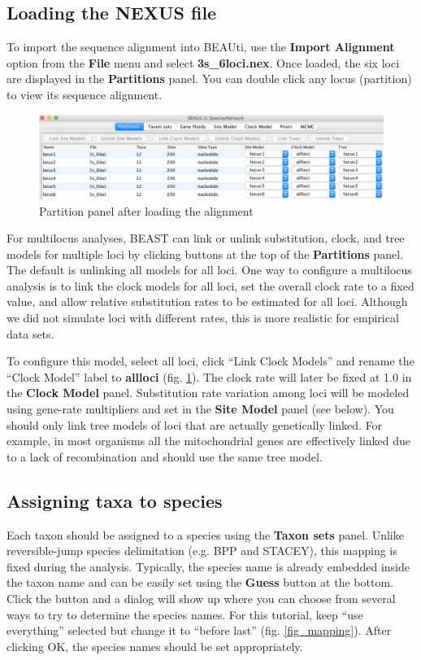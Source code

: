 \documentclass[11pt]{article}
\begin{document}
\subsection*{Loading the NEXUS file}

To import the sequence alignment into BEAUti, use the \textbf{Import Alignment} option from the \textbf{File} menu and select \textbf{3s\_6loci.nex}. Once loaded, the six loci are displayed in the \textbf{Partitions} panel. You can double click any locus (partition) to view its sequence alignment.

\begin{figure}[h]
\center
\includegraphics[width=1.0\textwidth]{figs/fig3_partition.png}
\caption{Partition panel after loading the alignment}
\label{fig_partition}
\end{figure}

For multilocus analyses, BEAST can link or unlink substitution, clock, and tree models for multiple loci by clicking buttons at the top of the \textbf{Partitions} panel. The default is unlinking all models for all loci.
One way to configure a multilocus analysis is to link the clock models for all loci, set the overall clock rate to a fixed value, and allow relative substitution rates to be estimated for all loci. Although we did not simulate loci with different rates, this is more realistic for empirical data sets.

To configure this model, select all loci, click ``Link Clock Models'' and rename the ``Clock Model'' label to \textbf{allloci} (fig. \ref{fig_partition}). The clock rate will later be fixed at 1.0 in the \textbf{Clock Model} panel. Substitution rate variation among loci will be modeled using gene-rate multipliers and set in the \textbf{Site Model} panel (see below).
You should only link tree models of loci that are actually genetically linked. For example, in most organisms all the mitochondrial genes are effectively linked due to a lack of recombination and should use the same tree model.

\subsection*{Assigning taxa to species}
Each taxon should be assigned to a species using the \textbf{Taxon sets} panel. Unlike reversible-jump species delimitation (e.g. BPP and STACEY), this mapping is fixed during the analysis. Typically, the species name is already embedded inside the taxon name and can be easily set using the \textbf{Guess} button at the bottom. Click the button and a dialog will show up where you can choose from several ways to try to determine the species names. For this tutorial, keep ``use everything'' selected but change it to ``before last'' (fig. \ref{fig_mapping}). After clicking OK, the species names should be set appropriately.
\end{document}

